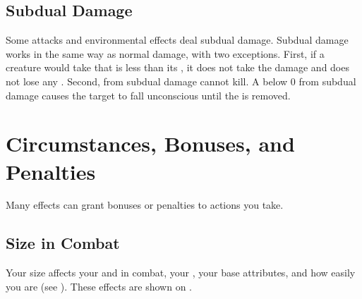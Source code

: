     \subsection{Subdual Damage}\label{Subdual Damage}
        Some attacks and environmental effects deal subdual damage.
        Subdual damage works in the same way as normal damage, with two exceptions.
        First, if a creature would take  that is less than its , it does not take the damage and does not lose any .
        Second,  from subdual damage cannot kill.
        A  below 0 from subdual damage causes the target to fall unconscious until the  is removed.

\section{Circumstances, Bonuses, and Penalties}

    Many effects can grant bonuses or penalties to actions you take.

    \subsection{Size in Combat}\label{Size in Combat}
        Your size affects your  and  in combat, your , your base attributes, and how easily you are  (see ).
        These effects are shown on .

